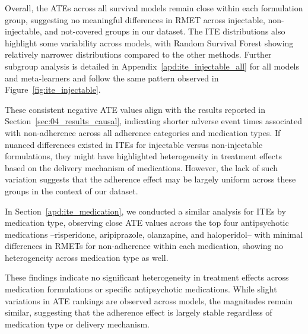 Overall, the ATEs across all survival models remain close within each formulation group, suggesting no meaningful differences in RMET across injectable, non-injectable, and not-covered groups in our dataset.
The ITE distributions also highlight some variability across models, with Random Survival Forest showing relatively narrower distributions compared to the other methods.
Further subgroup analysis is detailed in Appendix~\ref{apd:ite_injectable_all} for all models and meta-learners and follow the same pattern observed in Figure~\ref{fig:ite_injectable}.

These consistent negative ATE values align with the results reported in Section~\ref{sec:04_results_causal}, indicating shorter adverse event times associated with non-adherence across all adherence categories and medication types.
If nuanced differences existed in ITEs for injectable versus non-injectable formulations, they might have highlighted heterogeneity in treatment effects based on the delivery mechanism of medications.
However, the lack of such variation suggests that the adherence effect may be largely uniform across these groups in the context of our dataset.

In Section~\ref{apd:ite_medication}, we conducted a similar analysis for ITEs by medication type, observing close ATE values across the top four antipsychotic medications --risperidone, aripiprazole, olanzapine, and haloperidol-- with minimal differences in RMETs for non-adherence within each medication, showing no heterogeneity across medication type as well.

These findings indicate no significant heterogeneity in treatment effects across medication formulations or specific antipsychotic medications.
While slight variations in ATE rankings are observed across models, the magnitudes remain similar, suggesting that the adherence effect is largely stable regardless of medication type or delivery mechanism.